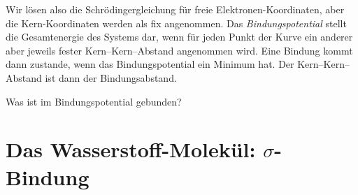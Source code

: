 

Wir lösen also die Schrödingergleichung für freie Elektronen-Koordinaten, aber die Kern-Koordinaten werden als fix angenommen. Das \emph{Bindungspotential} stellt die Gesamtenergie des Systems dar, wenn für jeden Punkt der Kurve ein anderer aber jeweils fester Kern--Kern--Abstand angenommen wird. Eine Bindung kommt dann zustande, wenn das Bindungspotential ein Minimum hat. Der Kern--Kern--Abstand ist dann der Bindungsabstand.

\begin{questions} 
\item Was ist im Bindungspotential gebunden?
\end{questions}

\section{Das Wasserstoff-Molekül: $\sigma$-Bindung}


